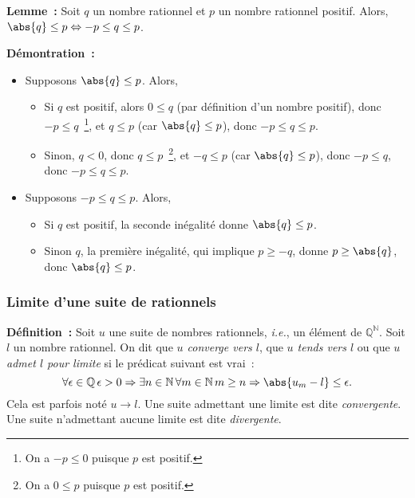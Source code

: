     \done

\medskip

\noindent\textbf{Lemme :} Soit $q$ un nombre rationnel et $p$ un nombre rationnel positif. 
    Alors, $\abs{q} \leq p \Leftrightarrow -p \leq q \leq p$.

\medskip

\noindent\textbf{Démontration :} 
\begin{itemize}[nosep]
    \item Supposons $\abs{q} \leq p$. 
        Alors, 
        \begin{itemize}[nosep]
            \item Si $q$ est positif, alors $0 \leq q$ (par définition d'un nombre positif), donc $-p \leq q$~\footnote{On a $-p \leq 0$ puisque $p$ est positif.}, et $q \leq p$ (car $\abs{q} \leq p$), donc $-p \leq q \leq p$.
            \item Sinon, $q < 0$, donc $q \leq p$~\footnote{On a $0 \leq p$ puisque $p$ est positif.}, et $-q \leq p$ (car $\abs{q} \leq p$), donc $-p \leq q$, donc $-p \leq q \leq p$.
        \end{itemize}
    \item Supposons $-p \leq q \leq p$.
        Alors, 
        \begin{itemize}[nosep]
            \item Si $q$ est positif, la seconde inégalité donne $\abs{q} \leq p$.
            \item Sinon $q$, la première inégalité, qui implique $p \geq -q$, donne $p \geq \abs{q}$, donc $\abs{q} \leq p$.
        \end{itemize}
\end{itemize}

\done

\subsubsection{Limite d'une suite de rationnels}

\noindent\textbf{Définition :} Soit $u$ une suite de nombres rationnels, \emph{i.e.}, un élément de $\mathbb{Q}^{\mathbb{N}}$.
    Soit $l$ un nombre rationnel.
    On dit que \emph{$u$ converge vers $l$}, que \emph{$u$ tends vers $l$} ou que \emph{$u$ admet $l$ pour limite} si le prédicat suivant est vrai : 
    \begin{equation*}
        \forall \epsilon \in \mathbb{Q} \, 
        \epsilon > 0 \Rightarrow
            \exists n \in \mathbb{N} \, 
            \forall m \in \mathbb{N} \, 
            m \geq n \Rightarrow
                \abs{u_m - l} \leq \epsilon .
    \end{equation*}
    Cela est parfois noté $u \rightarrow l$.
    Une suite admettant une limite est dite \emph{convergente}. 
    Une suite n'admettant aucune limite est dite \emph{divergente}. 

